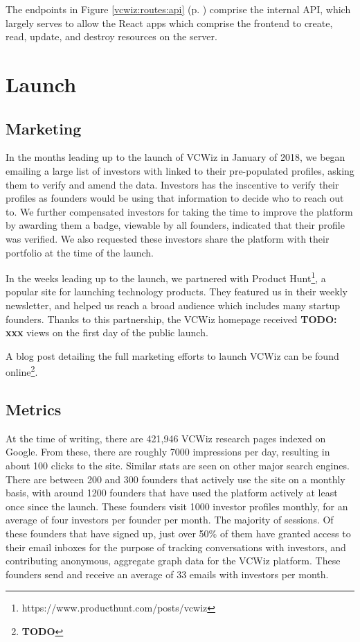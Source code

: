 The endpoints in Figure \ref{vcwiz:routes:api} (p. \pageref{vcwiz:routes:api}) comprise the internal API, which largely serves to allow the React apps which comprise the frontend to create, read, update, and destroy resources on the server.

\section{Launch}

\subsection{Marketing}

In the months leading up to the launch of VCWiz in January of 2018, we began emailing a large list of investors with linked to their pre-populated profiles, asking them to verify and amend the data. Investors has the inscentive to verify their profiles as founders would be using that information to decide who to reach out to. We further compensated investors for taking the time to improve the platform by awarding them a badge, viewable by all founders, indicated that their profile was verified. We also requested these investors share the platform with their portfolio at the time of the launch.

In the weeks leading up to the launch, we partnered with Product Hunt\footnote{https://www.producthunt.com/posts/vcwiz}, a popular site for launching technology products. They featured us in their weekly newsletter, and helped us reach a broad audience which includes many startup founders. Thanks to this partnership, the VCWiz homepage received \textbf{TODO: xxx} views on the first day of the public launch.

A blog post detailing the full marketing efforts to launch VCWiz can be found online\footnote{\textbf{TODO}}.

\subsection{Metrics}

At the time of writing, there are 421,946 VCWiz research pages indexed on Google. From these, there are roughly 7000 impressions per day, resulting in about 100 clicks to the site. Similar stats are seen on other major search engines. There are between 200 and 300 founders that actively use the site on a monthly basis, with around 1200 founders that have used the platform actively at least once since the launch. These founders visit 1000 investor profiles monthly, for an average of four investors per founder per month. The majority of sessions. Of these founders that have signed up, just over 50\% of them have granted access to their email inboxes for the purpose of tracking conversations with investors, and contributing anonymous, aggregate graph data for the VCWiz platform. These founders send and receive an average of 33 emails with investors per month.

